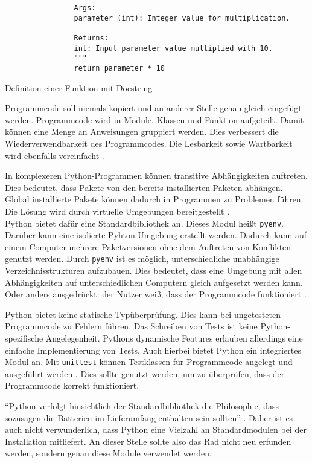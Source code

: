 \begin{description}[style=nextline]
\begin{listing}[H]
\begin{verbatim}
				Args:
				parameter (int): Integer value for multiplication.
				
				Returns:
				int: Input parameter value multiplied with 10.
				"""
				return parameter * 10
		\end{verbatim}
		\caption{Definition einer Funktion mit Docstring}
		\label{pc:docstring}
	\end{listing}
	
	\item[Modularisierung] Programmcode soll niemals kopiert und an anderer Stelle genau gleich eingefügt werden.
	Programmcode wird in Module, Klassen und Funktion aufgeteilt.
	Damit können eine Menge an Anweisungen gruppiert werden.
	Dies verbessert die Wiederverwendbarkeit des Programmcodes.
	Die Lesbarkeit sowie Wartbarkeit wird ebenfalls vereinfacht \cite{Klein2021-ko}.
	
	\item[Virtuelle Umgebungen] In komplexeren Python-Programmen können transitive Abhängigkeiten auftreten.
	Dies bedeutet, dass Pakete von den bereits installierten Paketen abhängen.
	Global installierte Pakete können dadurch in Programmen zu Problemen führen.
	Die Lösung wird durch virtuelle Umgebungen bereitgestellt \cite{Slatkin2015-xn}. \\
	
	Python bietet dafür eine Standardbibliothek an.
	Dieses Modul heißt \verb*|pyenv|.
	Darüber kann eine isolierte Pyhton-Umgebung erstellt werden.
	Dadurch kann auf einem Computer mehrere Paketversionen ohne dem Auftreten von Konflikten genutzt werden.
	Durch \verb*|pyenv| ist es möglich, unterschiedliche unabhängige Verzeichnisstrukturen aufzubauen.
	Dies bedeutet, dass eine Umgebung mit allen Abhängigkeiten auf unterschiedlichen Computern gleich aufgesetzt werden kann.
	Oder anders ausgedrückt: der Nutzer weiß, dass der Programmcode funktioniert \cite{Slatkin2015-xn}.
	
	\item[Tests] Python bietet keine statische Typüberprüfung.
	Dies kann bei ungetesteten Programmcode zu Fehlern führen.
	Das Schreiben von Tests ist keine Python-spezifische Angelegenheit.
	Pythons dynamische Features erlauben allerdings eine einfache Implementierung von Tests.
	Auch hierbei bietet Python ein integriertes Modul an.
	Mit \verb*|unittest| können Testklassen für Programmcode angelegt und ausgeführt werden \cite{Slatkin2015-xn}.
	Dies sollte genutzt werden, um zu überprüfen, dass der Programmcode korrekt funktioniert.
	
	\item[Standardbibliotheken] \enquote{Python verfolgt hinsichtlich der Standardbibliothek die Philosophie, dass sozusagen die Batterien im Lieferumfang enthalten sein sollten} \cite{Slatkin2015-xn}.
	Daher ist es auch nicht verwunderlich, dass Python eine Vielzahl an Standardmodulen bei der Installation mitliefert.
	An dieser Stelle sollte also das Rad nicht neu erfunden werden, sondern genau diese Module verwendet werden.
	

\end{description}
